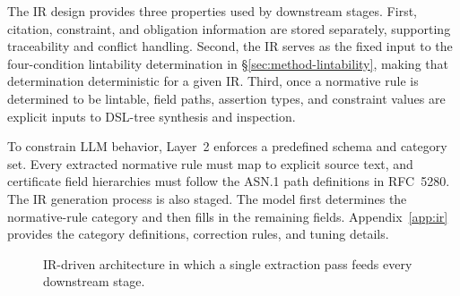 The IR design provides three properties used by downstream stages.
First, citation, constraint, and obligation information are stored separately, supporting traceability and conflict handling.
Second, the IR serves as the fixed input to the four-condition lintability determination in \S\ref{sec:method-lintability}, making that determination deterministic for a given IR.
Third, once a normative rule is determined to be lintable, field paths, assertion types, and constraint values are explicit inputs to DSL-tree synthesis and inspection.

To constrain LLM behavior, Layer~2 enforces a predefined schema and category set.
Every extracted normative rule must map to explicit source text, and certificate field hierarchies must follow the ASN.1 path definitions in RFC~5280.
The IR generation process is also staged. The model first determines the normative-rule category and then fills in the remaining fields.
Appendix~\ref{app:ir} provides the category definitions, correction rules, and tuning details.

\begin{figure}[tb]
  \centering
  \caption{IR-driven architecture in which a single extraction pass feeds every
    downstream stage.}
  \label{fig:ir-downstream}
\end{figure}
